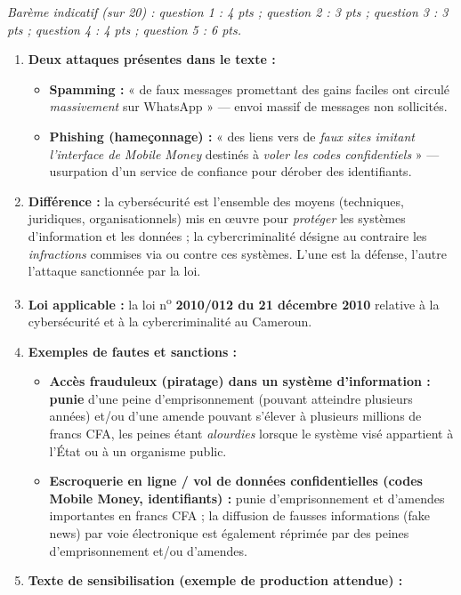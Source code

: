 \documentclass[11pt]{article}
\newcommand{\cle}[1]{{\popxbold\color{popdark}#1}}
\begin{document}
\begin{corrige}
\emph{Barème indicatif (sur 20) : question 1 : 4 pts ; question 2 : 3 pts ; question 3 : 3 pts ; question 4 : 4 pts ; question 5 : 6 pts.}
\begin{enumerate}
\item \textbf{Deux attaques présentes dans le texte :}
\begin{itemize}
\item \textbf{Spamming :} « de faux messages promettant des gains faciles ont circulé \emph{massivement} sur WhatsApp » — envoi massif de messages non sollicités.
\item \textbf{Phishing (hameçonnage) :} « des liens vers de \emph{faux sites imitant l'interface de Mobile Money} destinés à \emph{voler les codes confidentiels} » — usurpation d'un service de confiance pour dérober des identifiants.
\end{itemize}
\item \textbf{Différence :} la \cle{cybersécurité} est l'ensemble des moyens (techniques, juridiques, organisationnels) mis en œuvre pour \emph{protéger} les systèmes d'information et les données ; la \cle{cybercriminalité} désigne au contraire les \emph{infractions} commises via ou contre ces systèmes. L'une est la défense, l'autre l'attaque sanctionnée par la loi.
\item \textbf{Loi applicable :} la loi n\textsuperscript{o} \textbf{2010/012 du 21 décembre 2010} relative à la cybersécurité et à la cybercriminalité au Cameroun.
\item \textbf{Exemples de fautes et sanctions :}
\begin{itemize}
\item \textbf{Accès frauduleux (piratage) dans un système d'information :} \textbf{punie} d'une peine d'emprisonnement (pouvant atteindre plusieurs années) et/ou d'une amende pouvant s'élever à plusieurs millions de francs CFA, les peines étant \emph{alourdies} lorsque le système visé appartient à l'État ou à un organisme public.
\item \textbf{Escroquerie en ligne / vol de données confidentielles (codes Mobile Money, identifiants) :} punie d'emprisonnement et d'amendes importantes en francs CFA ; la diffusion de fausses informations (fake news) par voie électronique est également réprimée par des peines d'emprisonnement et/ou d'amendes.
\end{itemize}
\item \textbf{Texte de sensibilisation (exemple de production attendue) :}


\end{enumerate}
\end{corrige}
\end{document}
